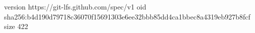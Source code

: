 version https://git-lfs.github.com/spec/v1
oid sha256:b4d190d79718c36070f15691303e6ee32bbb85dd4ca1bbec8a4319eb927b8fcf
size 422
